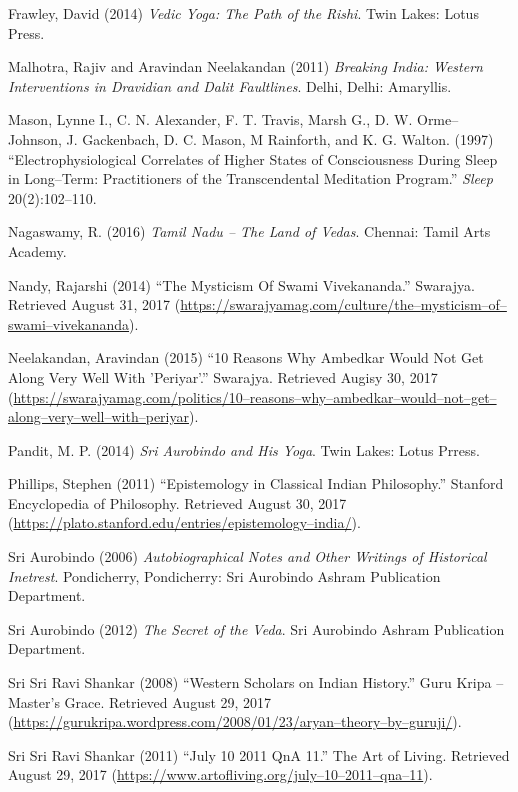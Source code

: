 \begin{thebibliography}{99}
  Frawley, David (2014) \textit{Vedic Yoga: The Path of the Rishi}. Twin Lakes: Lotus Press.

  Malhotra, Rajiv and Aravindan Neelakandan (2011) \textit{Breaking India: Western Interventions in Dravidian and Dalit Faultlines}. Delhi, Delhi: Amaryllis.

  Mason, Lynne I., C. N. Alexander, F. T. Travis, Marsh G., D. W. Orme–Johnson, J. Gackenbach, D. C. Mason, M Rainforth, and K. G. Walton. (1997) “Electrophysiological Correlates of Higher States of Consciousness During Sleep in Long–Term: Practitioners of the Transcendental Meditation Program.” \textit{Sleep} 20(2):102–110.

  Nagaswamy, R. (2016) \textit{Tamil Nadu – The Land of Vedas}. Chennai: Tamil Arts Academy.

  Nandy, Rajarshi (2014) “The Mysticism Of Swami Vivekananda.” Swarajya. Retrieved August 31, 2017 (\url{https://swarajyamag.com/culture/the–mysticism–of–swami–vivekananda}).

  Neelakandan, Aravindan (2015) “10 Reasons Why Ambedkar Would Not Get Along Very Well With 'Periyar'.” Swarajya. Retrieved Augisy 30, 2017 (\url{https://swarajyamag.com/politics/10–reasons–why–ambedkar–would–not–get–along–very–well–with–periyar}).

  Pandit, M. P. (2014) \textit{Sri Aurobindo and His Yoga}. Twin Lakes: Lotus Prress.

  Phillips, Stephen (2011) “Epistemology in Classical Indian Philosophy.” Stanford Encyclopedia of Philosophy. Retrieved August 30, 2017 (\url{https://plato.stanford.edu/entries/epistemology–india/}).

  Sri Aurobindo (2006) \textit{Autobiographical Notes and Other Writings of Historical Inetrest}. Pondicherry, Pondicherry: Sri Aurobindo Ashram Publication Department.

  Sri Aurobindo (2012) \textit{The Secret of the Veda}. Sri Aurobindo Ashram Publication Department.

  Sri Sri Ravi Shankar (2008) “Western Scholars on Indian History.” Guru Kripa – Master's Grace. Retrieved August 29, 2017 (\url{https://gurukripa.wordpress.com/2008/01/23/aryan–theory–by–guruji/}).

  Sri Sri Ravi Shankar (2011) “July 10 2011 QnA 11.” The Art of Living. Retrieved August 29, 2017 (\url{https://www.artofliving.org/july–10–2011–qna–11}).


\end{thebibliography}
